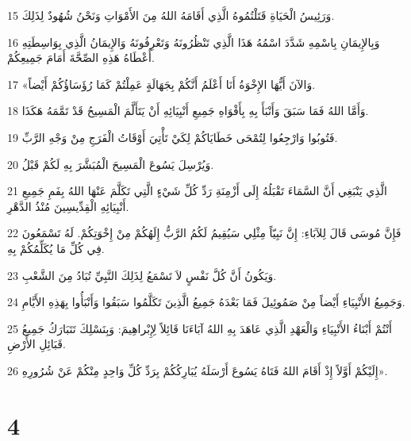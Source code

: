 \par 15 وَرَئِيسُ الْحَيَاةِ قَتَلْتُمُوهُ الَّذِي أَقَامَهُ اللهُ مِنَ الأَمْوَاتِ وَنَحْنُ شُهُودٌ لِذَلِكَ.
\par 16 وَبِالإِيمَانِ بِاسْمِهِ شَدَّدَ اسْمُهُ هَذَا الَّذِي تَنْظُرُونَهُ وَتَعْرِفُونَهُ وَالإِيمَانُ الَّذِي بِوَاسِطَتِهِ أَعْطَاهُ هَذِهِ الصِّحَّةَ أَمَامَ جَمِيعِكُمْ.
\par 17 «وَالآنَ أَيُّهَا الإِخْوَةُ أَنَا أَعْلَمُ أَنَّكُمْ بِجَهَالَةٍ عَمِلْتُمْ كَمَا رُؤَسَاؤُكُمْ أَيْضاً.
\par 18 وَأَمَّا اللهُ فَمَا سَبَقَ وَأَنْبَأَ بِهِ بِأَفْوَاهِ جَمِيعِ أَنْبِيَائِهِ أَنْ يَتَأَلَّمَ الْمَسِيحُ قَدْ تَمَّمَهُ هَكَذَا.
\par 19 فَتُوبُوا وَارْجِعُوا لِتُمْحَى خَطَايَاكُمْ لِكَيْ تَأْتِيَ أَوْقَاتُ الْفَرَجِ مِنْ وَجْهِ الرَّبِّ.
\par 20 وَيُرْسِلَ يَسُوعَ الْمَسِيحَ الْمُبَشَّرَ بِهِ لَكُمْ قَبْلُ.
\par 21 الَّذِي يَنْبَغِي أَنَّ السَّمَاءَ تَقْبَلُهُ إِلَى أَزْمِنَةِ رَدِّ كُلِّ شَيْءٍ الَّتِي تَكَلَّمَ عَنْهَا اللهُ بِفَمِ جَمِيعِ أَنْبِيَائِهِ الْقِدِّيسِينَ مُنْذُ الدَّهْرِ.
\par 22 فَإِنَّ مُوسَى قَالَ لِلآبَاءِ: إِنَّ نَبِيّاً مِثْلِي سَيُقِيمُ لَكُمُ الرَّبُّ إِلَهُكُمْ مِنْ إِخْوَتِكُمْ. لَهُ تَسْمَعُونَ فِي كُلِّ مَا يُكَلِّمُكُمْ بِهِ.
\par 23 وَيَكُونُ أَنَّ كُلَّ نَفْسٍ لاَ تَسْمَعُ لِذَلِكَ النَّبِيِّ تُبَادُ مِنَ الشَّعْبِ.
\par 24 وَجَمِيعُ الأَنْبِيَاءِ أَيْضاً مِنْ صَمُوئِيلَ فَمَا بَعْدَهُ جَمِيعُ الَّذِينَ تَكَلَّمُوا سَبَقُوا وَأَنْبَأُوا بِهَذِهِ الأَيَّامِ.
\par 25 أَنْتُمْ أَبْنَاءُ الأَنْبِيَاءِ وَالْعَهْدِ الَّذِي عَاهَدَ بِهِ اللهُ آبَاءَنَا قَائِلاً لِإِبْراهِيمَ: وَبِنَسْلِكَ تَتَبَارَكُ جَمِيعُ قَبَائِلِ الأَرْضِ.
\par 26 إِلَيْكُمْ أَوَّلاً إِذْ أَقَامَ اللهُ فَتَاهُ يَسُوعَ أَرْسَلَهُ يُبَارِكُكُمْ بِرَدِّ كُلِّ وَاحِدٍ مِنْكُمْ عَنْ شُرُورِهِ».

\chapter{4}

